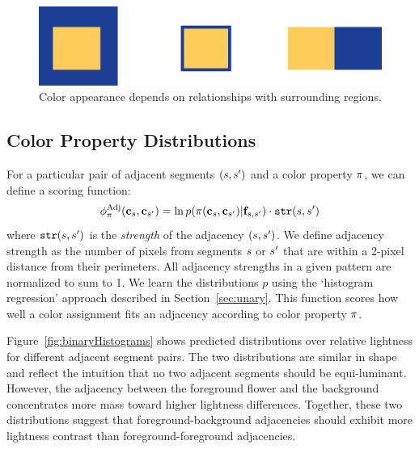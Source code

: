 \begin{figure}[h!]
\centering
\includegraphics[width=.7\columnwidth]{figs/surround}
\caption{Color appearance depends on relationships with surrounding regions.}
\label{fig:surround}
\end{figure}

\subsection{Color Property Distributions}
\label{sec:binaryDistribs}

For a particular pair of adjacent segments $(s, {s^{\prime}})$ and a color property $\pi$, we can define a scoring function: %
\begin{equation*}
\phi^{\textrm{Adj}}_\pi(\mathbf{c}_s, \mathbf{c}_{s^{\prime}}) = \ln p( \pi( \mathbf{c}_s, \mathbf{c}_{s^{\prime}} ) | \mathbf{f}_{s, {s^{\prime}}} ) \cdot \texttt{str}(s, {s^{\prime}})
\end{equation*}
where $\texttt{str}(s,{s^{\prime}})$ is the \emph{strength} of the adjacency $(s,{s^{\prime}})$. We define adjacency strength as the number of pixels from segments $s$ or ${s^{\prime}}$ that are within a 2-pixel distance from their perimeters. All adjacency strengths in a given pattern are normalized to sum to 1. We learn the distributions $p$ using the `histogram regression' approach described in Section~\ref{sec:unary}. This function scores how well a color assignment fits an adjacency according to color property $\pi$.

Figure~\ref{fig:binaryHistograms} shows predicted distributions over relative lightness for different adjacent segment pairs. The two distributions are similar in shape and reflect the intuition that no two adjacent segments should be equi-luminant. However, the adjacency between the foreground flower and the background concentrates more mass toward higher lightness differences. Together, these two distributions suggest that foreground-background adjacencies should exhibit more lightness contrast than foreground-foreground adjacencies.

